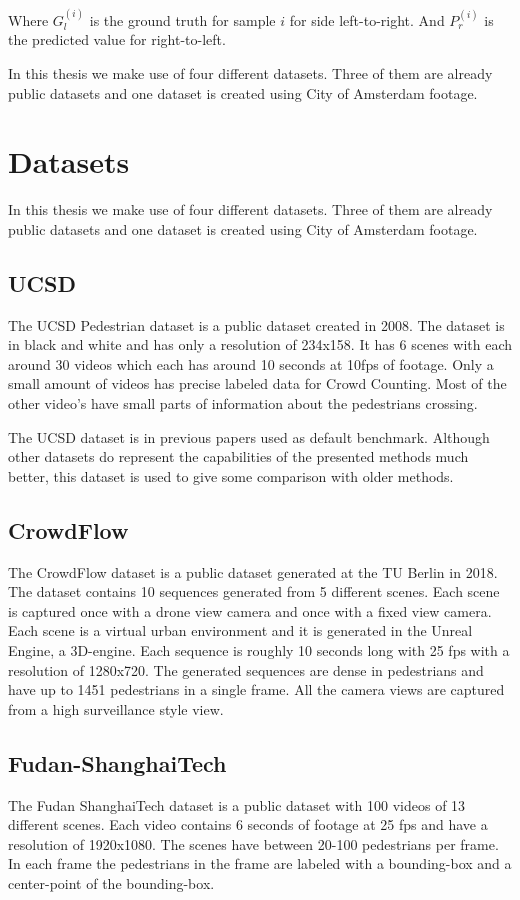 Where $G_l^{(i)}$ is the ground truth for sample $i$ for side left-to-right. And $P_r^{(i)}$ is the predicted value for right-to-left.

In this thesis we make use of four different datasets. Three of them are already public datasets and one dataset is created using City of Amsterdam footage.

\section{Datasets}
In this thesis we make use of four different datasets. Three of them are already public datasets and one dataset is created using City of Amsterdam footage.

\subsection{UCSD}
The UCSD Pedestrian dataset \cite{Chan2008} is a public dataset created in 2008. The dataset is in black and white and has only a resolution of 234x158. It has 6 scenes with each around 30 videos which each has around 10 seconds at 10fps of footage. Only a small amount of videos has precise labeled data for Crowd Counting. Most of the other video's have small parts of information about the pedestrians crossing.

The UCSD dataset is in previous papers used as default benchmark. Although other datasets do represent the capabilities of the presented methods much better, this dataset is used to give some comparison with older methods.

\subsection{CrowdFlow}
The CrowdFlow dataset \cite{Schroder2019} is a public dataset generated at the TU Berlin in 2018. The dataset contains 10 sequences generated from 5 different scenes. Each scene is captured once with a drone view camera and once with a fixed view camera. Each scene is a virtual urban environment and it is generated in the Unreal Engine, a 3D-engine. Each sequence is roughly 10 seconds long with 25 fps with a resolution of 1280x720. The generated sequences are dense in pedestrians and have up to 1451 pedestrians in a single frame. All the camera views are captured from a high surveillance style view.

\subsection{Fudan-ShanghaiTech}
The Fudan ShanghaiTech dataset \cite{Fang2019} is a public dataset with 100 videos of 13 different scenes. Each video contains 6 seconds of footage at 25 fps and have a resolution of 1920x1080. The scenes have between 20-100 pedestrians per frame. In each frame the pedestrians in the frame are labeled with a bounding-box and a center-point of the bounding-box.

